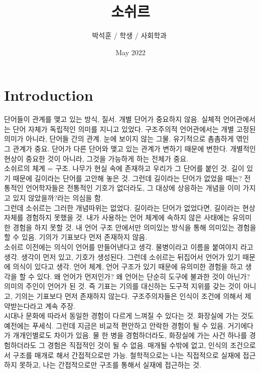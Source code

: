 \documentclass{article}
\title{소쉬르}
\author{박석훈 / 학생 / 사회학과 ­}
\date{May 2022}
\begin{document}
\maketitle

\section{Introduction}



단어들이 관계를 맺고 있는 방식, 질서. 개별 단어가 중요하지 않음. 실체적 언어관에서는 단어 자체가 독립적인 의미를 지니고 있었다. 구조주의적 언어관에서는 개별 고정된 의미가 아니라, 단어들 간의 관계. 눈에 보이지 않는 그물. 유기적으로 촘촘하게 엮인 그 관계가 중요. 단어가 다른 단어와 맺고 있는 관계가 변하기 때문에 변한다. 개별적인 현상이 중요한 것이 아니라, 그것을 가능하게 하는 전체가 중요. \\

소쉬르의 체계 = 구조. 나무가 현실 속에 존재하고 우리가 그 단어를 붙인 것. 길이 있기 때문에 길이라는 단어를 고안해 놓은 것. 그런데 길이라는 단어가 없었을 때는? 전통적인 언어학자들은 전통적인 기호가 없더라도, 그 대상에 상응하는 개념을 이미 가지고 있지 않았을까?라는 의심을 함.\\

그런데 소쉬르는 그러한 개념따위는 없었다. 길이라는 단어가 없었다면, 길이라는 현상 자체를 경험하지 못했을 것. 내가 사용하는 언어 체계에 속하지 않은 사태에는 유의미한 경험을 하지 못할 것. 내 언어 구조 안에서만 의미있는 방식을 통해 의미있는 경험을 할 수 있음. 기의가 기표보다 먼저 존재하지 않음. \\

소쉬르 이전에는 의식이 언어를 만들어낸다고 생각. 물병이라고 이름을 붙여야지 라고 생각. 생각이 먼저 있고, 기호가 생성된다. 그런데 소쉬르는 뒤집어서 언어가 있기 때문에 의식이 있다고 생각. 언어 체계, 언어 구조가 있기 때문에 유의미한 경험을 하고 생각을 할 수 있다. 왜 언어가 먼저인가? 왜 언어는 단순히 도구에 불과한 것이 아닌가? 의미의 주인이 언어가 된 것. 즉 기표는 기의를 대신하는 도구적 지위를 갖는 것이 아니고, 기의는 기표보다 먼저 존재하지 않는다. 구조주의자들은 인식이 조건에 의해서 제약받는다라고 계속 주장.\\

시대나 문화에 따라서 동일한 경험이 다르게 느껴질 수 있다는 것. 화장실에 가는 것도 예전에는 푸세식. 그런데 지금은 비교적 편안하고 안락한 경험이 될 수 있음. 거기에다가 개개인별로도 차이가 있음. 물 한 병을 경험하더라도, 화장실에 가는 사건 하나를 경험하더라도 그 경험은 직접적인 것이 될 수 없음. 매개될 수밖에 없고, 인식의 조건으로서 구조를 매개로 해서 간접적으로만 가능. 철학적으로는 나는 직접적으로 실재에 접근하지 못하고, 나는 간접적으로만 구조를 통해서 실재에 접근하는 것.\\
\end{document}
